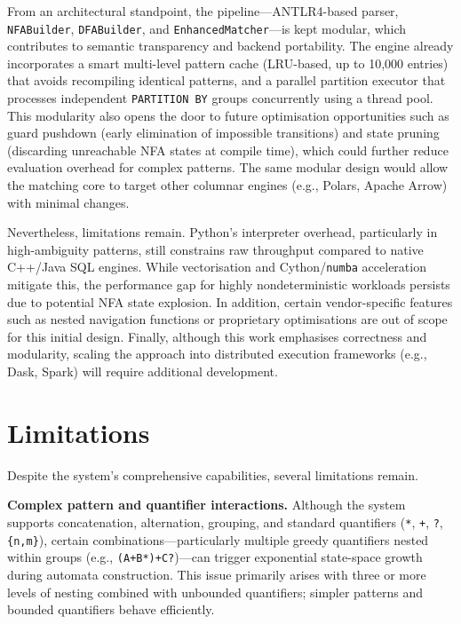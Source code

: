 From an architectural standpoint, the pipeline---ANTLR4-based parser,
\texttt{NFABuilder}, \texttt{DFABuilder}, and
\texttt{EnhancedMatcher}---is kept modular, which contributes to
semantic transparency and backend portability.  The engine already
incorporates a smart multi-level pattern cache (LRU-based, up to
10{,}000 entries) that avoids recompiling identical patterns, and a
parallel partition executor that processes independent
\texttt{PARTITION BY} groups concurrently using a thread pool.
This modularity also opens the door to future optimisation
opportunities such as guard pushdown (early elimination of impossible
transitions) and state pruning (discarding unreachable NFA states at
compile time), which could further reduce evaluation overhead for
complex patterns.  The same modular design would allow the matching
core to target other columnar engines (e.g., Polars, Apache Arrow)
with minimal changes.

Nevertheless, limitations remain.  Python's interpreter overhead,
particularly in high-ambiguity patterns, still constrains raw
throughput compared to native C++/Java SQL engines.  While
vectorisation and Cython/\texttt{numba} acceleration mitigate this,
the performance gap for highly nondeterministic workloads persists due
to potential NFA state explosion.  In addition, certain vendor-specific
features such as nested navigation functions or proprietary
optimisations are out of scope for this initial design.
Finally, although this work emphasises correctness and modularity,
scaling the approach into distributed execution frameworks
(e.g., Dask, Spark) will require additional development.

\section{Limitations}
\label{sec:conc-limitations}

Despite the system's comprehensive capabilities, several limitations
remain.

\textbf{Complex pattern and quantifier interactions.}
Although the system supports concatenation, alternation, grouping, and
standard quantifiers (\texttt{*}, \texttt{+}, \texttt{?},
\texttt{\{n,m\}}), certain combinations---particularly multiple greedy
quantifiers nested within groups (e.g., \texttt{(A+B*)+C?})---can
trigger exponential state-space growth during automata construction.
This issue primarily arises with three or more levels of nesting
combined with unbounded quantifiers; simpler patterns and bounded
quantifiers behave efficiently.

